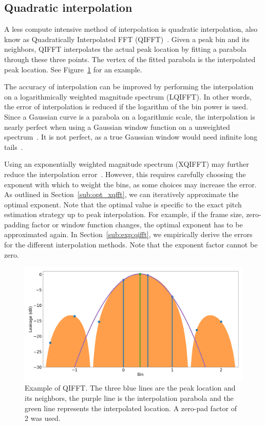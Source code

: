 \documentclass[a4paper,10pt,twocolumn]{article}
\begin{document}
\subsection{Quadratic interpolation}  \label{sub:qifft}
A less compute intensive method of interpolation is quadratic interpolation, also know as Quadratically Interpolated FFT (QIFFT)~\cite{interpolnozero}. Given a peak bin and its neighbors, QIFFT interpolates the actual peak location by fitting a parabola through these three points. The vertex of the fitted parabola is the interpolated peak location. See Figure~\ref{fig:qifft} for an example.

The accuracy of interpolation can be improved by performing the interpolation on a logarithmically weighted magnitude spectrum (LQIFFT). In other words, the error of interpolation is reduced if the logarithm of the bin power is used. Since a Gaussian curve is a parabola on a logarithmic scale, the interpolation is nearly perfect when using a Gaussian window function on a unweighted spectrum~\cite{interpolgaus}. It is not perfect, as a true Gaussian window would need infinite long tails~\cite{gauswin}.

Using an exponentially weighted magnitude spectrum (XQIFFT) may further reduce the interpolation error~\cite{interpolnozero}. However, this requires carefully choosing the exponent with which to weight the bins, as some choices may increase the error. As outlined in Section~\ref{sub:opt_xqfft}, we can iteratively approximate the optimal exponent. Note that the optimal value is specific to the exact pitch estimation strategy up to peak interpolation. For example, if the frame size, zero-padding factor or window function changes, the optimal exponent has to be approximated again. In Section~\ref{sub:exp:qifft}, we empirically derive the errors for the different interpolation methods. Note that the exponent factor cannot be zero.
\begin{figure}[b!]
    \centering
    \includegraphics[width=\linewidth]{fig/qifft.png}
    \caption{Example of QIFFT. The three blue lines are the peak location and its neighbors, the purple line is the interpolation parabola and the green line represents the interpolated location. A zero-pad factor of 2 was used.}
    \label{fig:qifft}
\end{figure}
\end{document}
